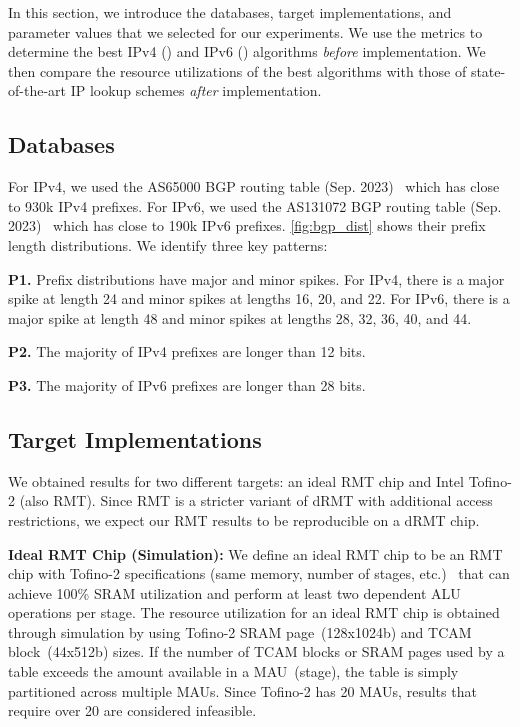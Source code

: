 In this section, we introduce the databases, target implementations, and parameter values that we selected for our experiments. We use the \cram metrics to determine the best IPv4 (\resail) and IPv6 (\bsic) algorithms {\em before} implementation. We then compare the resource utilizations of the best \cram algorithms with those of state-of-the-art IP lookup schemes {\em after} implementation.

\subsection{Databases} \label{subsec:databases}

For IPv4, we used the AS65000 BGP routing table (Sep. 2023)~\cite{cidr_report_ipv4} which has close to 930k IPv4 prefixes. For IPv6, we used the AS131072 BGP routing table (Sep. 2023)~\cite{cidr_report_ipv6} which has close to 190k IPv6 prefixes. \cref{fig:bgp_dist} shows their prefix length distributions. We identify three key patterns:

{\bf P1.} Prefix distributions have major and minor spikes. For IPv4, there is a major spike at length 24 and minor spikes at lengths 16, 20, and 22. For IPv6, there is a major spike at length 48 and minor spikes at lengths 28, 32, 36, 40, and 44.

{\bf P2.} The majority of IPv4 prefixes are longer than 12 bits.

{\bf P3.} The majority of IPv6 prefixes are longer than 28 bits.

\subsection{Target Implementations} \label{subsec:target_implementations}

We obtained results for two different targets: an ideal RMT chip and Intel Tofino-2 (also RMT). Since RMT is a stricter variant of dRMT with additional access restrictions, we expect our RMT results to be reproducible on a dRMT chip.

{\bf Ideal RMT Chip (Simulation):} We define an ideal RMT chip to be an RMT chip with Tofino-2 specifications (same memory, number of stages, etc.)~\cite{bf_p4c} that can achieve 100\% SRAM utilization and perform at least two dependent ALU operations per stage. The resource utilization for an ideal RMT chip is obtained through simulation by using Tofino-2 SRAM page~(128x1024b) and TCAM block~(44x512b) sizes. If the number of TCAM blocks or SRAM pages used by a table exceeds the amount available in a MAU~(stage), the table is simply partitioned across multiple MAUs. Since Tofino-2 has 20 MAUs, results that require over 20 are considered infeasible.

